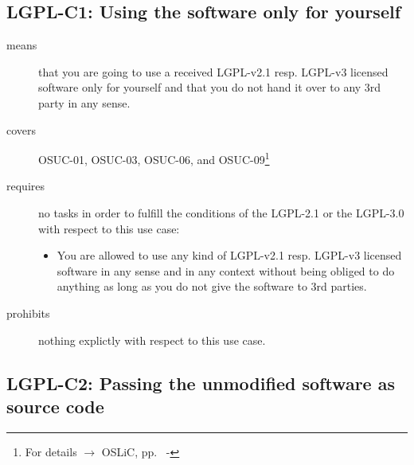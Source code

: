 

\subsection{LGPL-C1: Using the software only for yourself}
\label{OSUC-01-LGPL} \label{OSUC-03-LGPL}
\label{OSUC-06-LGPL} \label{OSUC-09-LGPL}

\begin{description}

\item[means] that you are going to use a received LGPL-v2.1 resp. LGPL-v3
licensed software only for yourself and that you do not hand it over to any 3rd
party in any sense.

\item[covers] OSUC-01, OSUC-03, OSUC-06, and OSUC-09\footnote{For details
$\rightarrow$ OSLiC, pp.\ \pageref{OSUC-01-DEF} - \pageref{OSUC-09-DEF}}

\item[requires] no tasks in order to fulfill the conditions of the LGPL-2.1 or
the LGPL-3.0 with respect to this use case:
  \begin{itemize}
    \item You are allowed to use any kind of LGPL-v2.1 resp. LGPL-v3 licensed
    software in any sense and in any context without being obliged to do
    anything as long as you do not give the software to 3rd parties.
  \end{itemize}

\item[prohibits] nothing explictly with respect to this use case.
\end{description}


\subsection{LGPL-C2: Passing the unmodified software as source code}
\label{OSUC-02S-LGPL} \label{OSUC-05S-LGPL} \label{OSUC-07S-LGPL} 

